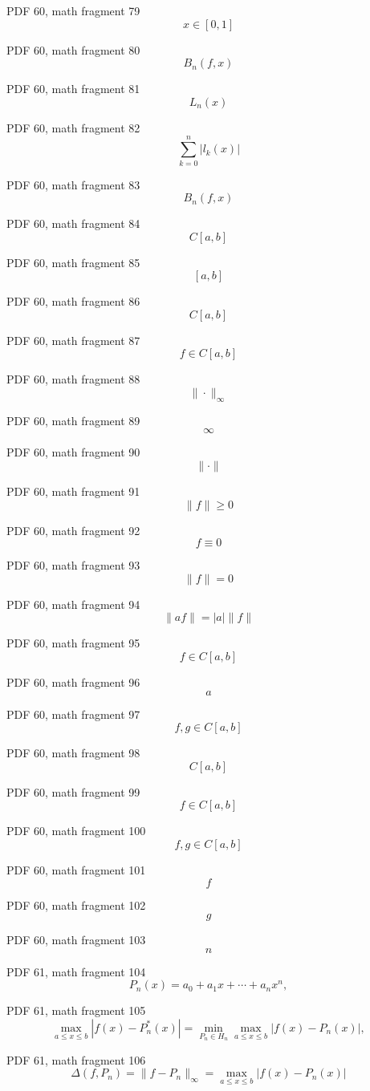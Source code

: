 \documentclass[UTF8,fontset=fandol]{ctexart}
\begin{document}
PDF 60, math fragment 79
\[x \in [0,1]\]
\par
PDF 60, math fragment 80
\[B_n(f,x)\]
\par
PDF 60, math fragment 81
\[L_n(x)\]
\par
PDF 60, math fragment 82
\[\sum_{k=0}^{n} |l_k(x)|\]
\par
PDF 60, math fragment 83
\[B_n(f,x)\]
\par
PDF 60, math fragment 84
\[C[a,b]\]
\par
PDF 60, math fragment 85
\[[a,b]\]
\par
PDF 60, math fragment 86
\[C[a,b]\]
\par
PDF 60, math fragment 87
\[f \in C[a,b]\]
\par
PDF 60, math fragment 88
\[\|\cdot\|_\infty\]
\par
PDF 60, math fragment 89
\[\infty\]
\par
PDF 60, math fragment 90
\[\|\cdot\|\]
\par
PDF 60, math fragment 91
\[\|f\| \geqslant 0\]
\par
PDF 60, math fragment 92
\[f \equiv 0\]
\par
PDF 60, math fragment 93
\[\|f\| = 0\]
\par
PDF 60, math fragment 94
\[\|af\| = |a| \|f\|\]
\par
PDF 60, math fragment 95
\[f \in C[a,b]\]
\par
PDF 60, math fragment 96
\[a\]
\par
PDF 60, math fragment 97
\[f,g \in C[a,b]\]
\par
PDF 60, math fragment 98
\[C[a,b]\]
\par
PDF 60, math fragment 99
\[f \in C[a,b]\]
\par
PDF 60, math fragment 100
\[f,g \in C[a,b]\]
\par
PDF 60, math fragment 101
\[f\]
\par
PDF 60, math fragment 102
\[g\]
\par
PDF 60, math fragment 103
\[n\]
\par
PDF 61, math fragment 104
\[
P_n(x) = a_0 + a_1x + \cdots + a_nx^n,
\]
\par
PDF 61, math fragment 105
\[
\max_{a \leqslant x \leqslant b} |f(x) - P_n^*(x)| = \min_{P_n \in H_n} \max_{a \leqslant x \leqslant b} |f(x) - P_n(x)|,
\]
\par
PDF 61, math fragment 106
\[
\Delta(f,P_n) = \|f - P_n\|_\infty = \max_{a \leqslant x \leqslant b} |f(x) - P_n(x)| \tag{3.2.1}
\]
\par
\end{document}
